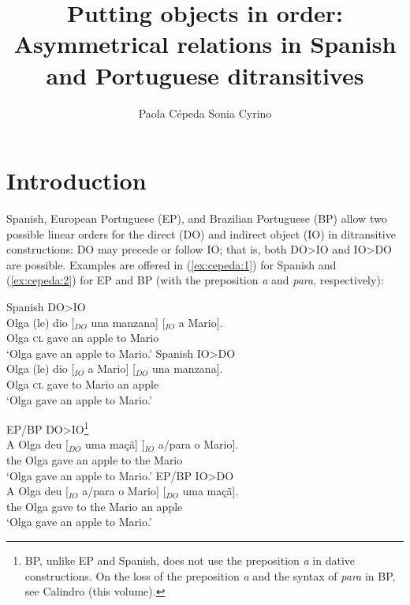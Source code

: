 \documentclass[output=paper,colorlinks,citecolor=brown]{./langscibook}
\author{Paola Cépeda\affiliation{Stony Brook University / Pontificia Universidad Católica del Perú}\lastand 
Sonia Cyrino\affiliation{University of Campinas}}
\title{Putting objects in order: Asymmetrical relations in Spanish and Portuguese ditransitives}
\begin{document}
\maketitle

\section{Introduction}\label{sec:cepeda:1}

Spanish, European Portuguese (EP), and Brazilian Portuguese (BP) allow two possible linear orders for the direct (DO) and indirect object (IO) in ditransitive constructions: DO may precede or follow IO; that is, both DO>IO and IO>DO are possible. Examples are offered in (\ref{ex:cepeda:1}) for Spanish and (\ref{ex:cepeda:2}) for EP and BP (with the preposition \textit{a} and \textit{para}, respectively):

\ea%
    \label{ex:cepeda:1}
	\ea\label{ex:cepeda:1a}
	Spanish DO>IO\\
	\gll Olga (le) dio [$_{DO}$ una manzana] [$_{IO}$ a  Mario]. \\
		Olga \textsc{cl} gave \hspaceThis{[$_{DO}$} an apple \hspaceThis{[$_{IO}$} to Mario \\
	\glt ‘Olga gave an apple to Mario.'
	\ex\label{ex:cepeda:1b}Spanish IO>DO\\
		\gll Olga (le) dio [$_{IO}$ a  Mario] [$_{DO}$ una manzana]. \\
			Olga \textsc{cl} gave \hspaceThis{[$_{IO}$} to Mario \hspaceThis{[$_{DO}$} an   apple\\
		\glt ‘Olga gave an apple to Mario.’
	\z
\z

\ea%
    \label{ex:cepeda:2}
	\ea\label{ex:cepeda:2a}
	EP/BP DO>IO\footnote{BP, unlike EP and Spanish, does not use the preposition \textit{a} in dative constructions. On the loss of the preposition \textit{a} and the syntax of \textit{para} in BP, see Calindro (this volume).}\\
	\gll A Olga  deu [$_{DO}$ uma maçã] [$_{IO}$ a/para  o  Mario].\\
		the Olga gave  \hspaceThis{[$_{DO}$} an   apple \hspaceThis{[$_{IO}$} to the Mario \\
	\glt ‘Olga gave an apple to Mario.’
	\ex\label{ex:cepeda:2b}EP/BP IO>DO\\
	\gll A Olga  deu [$_{IO}$ a/para  o  Mario] [$_{DO}$ uma maçã]. \\
		the Olga gave \hspaceThis{[$_{IO}$} to the Mario \hspaceThis{[$_{DO}$} an   apple \\
	\glt ‘Olga gave an apple to Mario.’
	\z
\z
\end{document}
